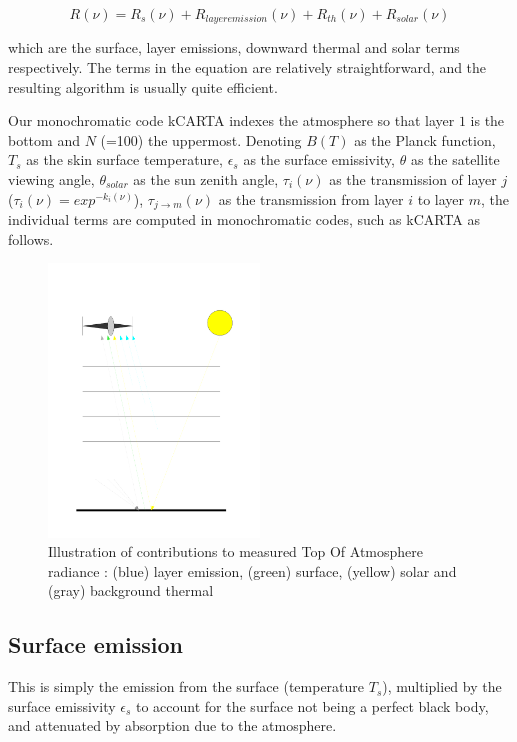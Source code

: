 \documentclass[11pt]{article}
\newcommand{\kc}{\textsf{kCARTA}\xspace}
\begin{document}
\begin{equation}
R(\nu) = R_{s}(\nu) + R_{layer emission}(\nu) + R_{th}(\nu) + R_{solar}(\nu)
\label{eqn:sch_detail}
\end{equation}

which are the surface, layer emissions, downward thermal and solar terms
respectively. The terms in the equation are relatively straightforward, and the resulting algorithm is 
usually quite efficient. 

Our monochromatic code \kc indexes the atmosphere so that layer $1$ is the bottom and
$N$ (=100) the uppermost. Denoting $B(T)$ as the Planck function, $T_{s}$ as
the skin surface temperature, $\epsilon_{s}$ as the surface emissivity,
$\theta$ as the satellite viewing angle, $\theta_{solar}$ as the sun zenith
angle, $\tau_{i}(\nu)$ as the transmission of layer $j$
($\tau_{i}(\nu) = exp^{-k_{i}(\nu)}$), $\tau_{j \rightarrow m}(\nu)$ as the
transmission from layer $i$ to layer $m$, the individual terms are computed in
monochromatic codes, such as \kc as follows.

\begin{figure}
\centering
\includegraphics[width=0.5\textwidth]{radiation1.pdf}
\caption{
Illustration of contributions to measured Top Of Atmosphere radiance :
 (blue) layer emission, (green) surface, (yellow) solar and (gray) background thermal
}
\end{figure}

\subsection{Surface emission}

This is simply the emission from the surface (temperature $T_{s}$),
multiplied by the surface emissivity $\epsilon_{s}$ to account for the surface
not being a perfect black body, and attenuated by absorption due to the
atmosphere.
\end{document}
